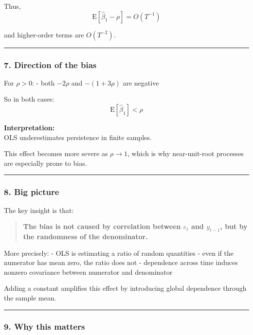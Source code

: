 \documentclass[11pt]{article}
\begin{document}
Thus, \[
\text{E}[\hat\beta_1 - \rho] = O(T^{-1})
\]

and higher-order terms are \(O(T^{-2})\).

\begin{center}\rule{0.5\linewidth}{0.5pt}\end{center}

\subsubsection{7. Direction of the bias}\label{direction-of-the-bias}

For \(\rho > 0\): - both \(-2\rho\) and \(-(1+3\rho)\) are negative

So in both cases: \[
\text{E}[\hat\beta_1] < \rho
\]

\textbf{Interpretation:}\\
OLS underestimates persistence in finite samples.

This effect becomes more severe as \(\rho \to 1\), which is why
near-unit-root processes are especially prone to bias.

\begin{center}\rule{0.5\linewidth}{0.5pt}\end{center}

\subsubsection{8. Big picture}\label{big-picture}

The key insight is that:

\begin{quote}
\textbf{The bias is not caused by correlation between \(e_t\) and
\(y_{t-1}\), but by the randomness of the denominator.}
\end{quote}

More precisely: - OLS is estimating a ratio of random quantities - even
if the numerator has mean zero, the ratio does not - dependence across
time induces nonzero covariance between numerator and denominator

Adding a constant amplifies this effect by introducing global dependence
through the sample mean.

\begin{center}\rule{0.5\linewidth}{0.5pt}\end{center}

\subsubsection{9. Why this matters}\label{why-this-matters}
\end{document}
